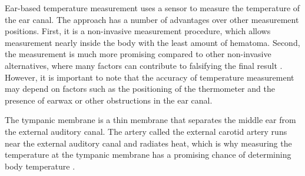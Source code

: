 Ear-based temperature measurement uses a sensor to measure the temperature of the ear canal. 
The approach has a number of advantages over other measurement positions.
First, it is a non-invasive measurement procedure, which allows measurement nearly inside the body with the least amount of hematoma.
Second, the measurement is much more promising compared to other non-invasive alternatives, where many factors can contribute to falsifying the final result \cite{ganioValidityReliabilityDevices2009, craigTemperatureMeasuredAxilla2000}. 
However, it is important to note that the accuracy of temperature measurement may depend on factors such as the positioning of the thermometer and the presence of earwax or other obstructions in the ear canal.

The tympanic membrane is a thin membrane that separates the middle ear from the external auditory canal. 
The artery called the external carotid artery runs near the external auditory canal and radiates heat, which is why measuring the temperature at the tympanic membrane has a promising chance of determining body temperature \cite{yeohRevisitingTympanicMembrane2017}.

